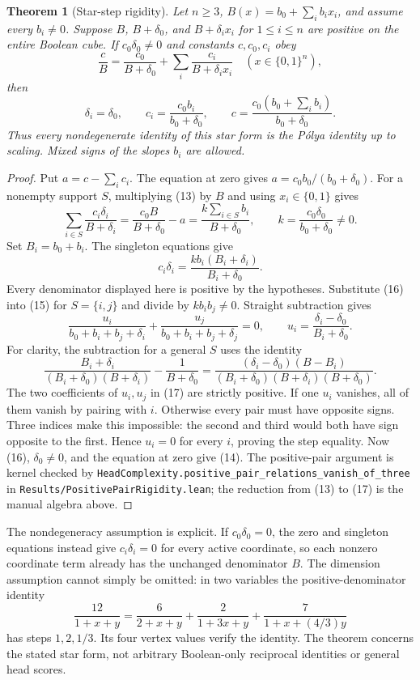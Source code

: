 \documentclass[11pt]{article}
\newtheorem{theorem}{Theorem}
\begin{document}
\begin{theorem}[Star-step rigidity]
Let $n\ge3$, $B(x)=b_0+\sum_i b_i x_i$, and assume every
$b_i\ne0$. Suppose $B$, $B+\delta_0$, and
$B+\delta_i x_i$ for $1\le i\le n$ are positive on the entire
Boolean cube. If $c_0\delta_0\ne0$ and constants $c,c_0,c_i$ obey
\[
             \frac cB=\frac{c_0}{B+\delta_0}
                          +\sum_i\frac{c_i}{B+\delta_i x_i}
                       \quad(x\in\{0,1\}^n),
 \tag{13}
\]
then
\[
 \delta_i=\delta_0,\qquad
 c_i=\frac{c_0 b_i}{b_0+\delta_0},\qquad
 c=\frac{c_0(b_0+\sum_i b_i)}{b_0+\delta_0}.
 \tag{14}
\]
Thus every nondegenerate identity of this star form is the P\'olya
identity up to scaling. Mixed signs of the slopes $b_i$ are allowed.
\end{theorem}
\begin{proof}
Put $a=c-\sum_i c_i$. The equation at zero gives
$a=c_0b_0/(b_0+\delta_0)$. For a nonempty support $S$, multiplying
(13) by $B$ and using $x_i\in\{0,1\}$ gives
\[
 \sum_{i\in S}\frac{c_i\delta_i}{B+\delta_i}
     =\frac{c_0B}{B+\delta_0}-a
     =\frac{k\sum_{i\in S}b_i}{B+\delta_0},
 \qquad k=\frac{c_0\delta_0}{b_0+\delta_0}\ne0.
 \tag{15}
\]
Set $B_i=b_0+b_i$. The singleton equations give
\[
          c_i\delta_i=
             \frac{k b_i(B_i+\delta_i)}{B_i+\delta_0}.
 \tag{16}
\]
Every denominator displayed here is positive by the hypotheses.
Substitute (16) into (15) for $S=\{i,j\}$ and divide by
$k b_i b_j\ne0$. Straight subtraction gives
\[
 \frac{u_i}{b_0+b_i+b_j+\delta_i}
 +\frac{u_j}{b_0+b_i+b_j+\delta_j}=0,
 \qquad u_i=\frac{\delta_i-\delta_0}{B_i+\delta_0}.
 \tag{17}
\]
For clarity, the subtraction for a general $S$ uses the identity
\[
 \frac{B_i+\delta_i}{(B_i+\delta_0)(B+\delta_i)}
             -\frac1{B+\delta_0}
 =\frac{(\delta_i-\delta_0)(B-B_i)}
 {(B_i+\delta_0)(B+\delta_i)(B+\delta_0)}.
\]
The two coefficients of $u_i,u_j$ in (17) are strictly positive.
If one $u_i$ vanishes, all of them vanish by pairing with $i$.
Otherwise every pair must have opposite signs. Three indices make
this impossible: the second and third would both have sign opposite
to the first. Hence $u_i=0$ for every $i$, proving the step equality.
Now (16), $\delta_0\ne0$, and the equation at zero give (14).
The positive-pair argument is kernel checked by
\texttt{HeadComplexity.positive\_pair\_relations\_vanish\_of\_three}
in \texttt{Results/PositivePairRigidity.lean}; the reduction from
(13) to (17) is the manual algebra above.
\end{proof}

The nondegeneracy assumption is explicit. If $c_0\delta_0=0$,
the zero and singleton equations instead give $c_i\delta_i=0$
for every active coordinate, so each nonzero coordinate term already
has the unchanged denominator $B$.
The dimension assumption cannot simply be omitted: in two variables
the positive-denominator identity
\[
 \frac{12}{1+x+y}=\frac6{2+x+y}
                   +\frac2{1+3x+y}
                   +\frac7{1+x+(4/3)y}
\]
has steps $1,2,1/3$. Its four vertex values verify the identity.
The theorem concerns the stated star form, not arbitrary Boolean-only
reciprocal identities or general head scores.
\end{document}
